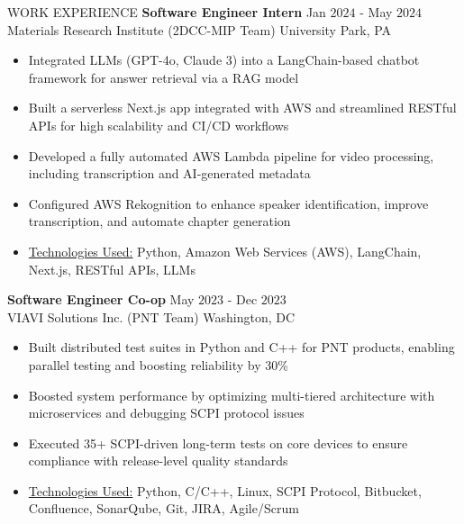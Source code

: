\documentclass{resume} %
\begin{document}
\begin{rSection}{WORK EXPERIENCE}
{\bf Software Engineer Intern} \hfill Jan $2024$ - May $2024$\\
Materials Research Institute (2DCC-MIP Team) \hfill University Park, PA
\begin{itemize}[itemsep = -4pt]
    \item Integrated LLMs (GPT-4o, Claude 3) into a LangChain-based chatbot framework for answer retrieval via a RAG model
    \item Built a serverless Next.js app integrated with AWS and streamlined RESTful APIs for high scalability and CI/CD workflows
    \item Developed a fully automated AWS Lambda pipeline for video processing, including transcription and AI-generated metadata
    \item Configured AWS Rekognition to enhance speaker identification, improve transcription, and automate chapter generation
    \item \underline{Technologies Used:} Python, Amazon Web Services (AWS), LangChain, Next.js, RESTful APIs, LLMs
\end{itemize}

{\bf Software Engineer Co-op} \hfill May $2023$ - Dec $2023$\\
VIAVI Solutions Inc. (PNT Team) \hfill Washington, DC
\begin{itemize}[itemsep = -4pt]
    \item Built distributed test suites in Python and C++ for PNT products, enabling parallel testing and boosting reliability by 30\%
    \item Boosted system performance by optimizing multi-tiered architecture with microservices and debugging SCPI protocol issues
    \item Executed 35+ SCPI-driven long-term tests on core devices to ensure compliance with release-level quality standards
    \item \underline{Technologies Used:} Python, C/C++, Linux, SCPI Protocol, Bitbucket, Confluence, SonarQube, Git, JIRA, Agile/Scrum
\end{itemize}


\end{rSection}
\end{document}
